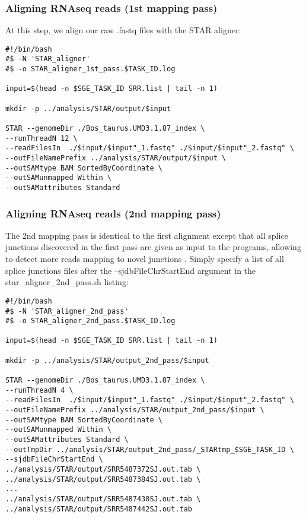 \subsubsection{Aligning RNAseq reads (1st mapping pass)}

At this step, we align our raw .fastq files with the STAR aligner:

\begin{verbatim}
#!/bin/bash
#$ -N 'STAR_aligner'
#$ -o STAR_aligner_1st_pass.$TASK_ID.log

input=$(head -n $SGE_TASK_ID SRR.list | tail -n 1)

mkdir -p ../analysis/STAR/output/$input

STAR --genomeDir ./Bos_taurus.UMD3.1.87_index \
--runThreadN 12 \
--readFilesIn  ./$input/$input"_1.fastq" ./$input/$input"_2.fastq" \
--outFileNamePrefix ../analysis/STAR/output/$input \
--outSAMtype BAM SortedByCoordinate \
--outSAMunmapped Within \
--outSAMattributes Standard
\end{verbatim}



\subsubsection{Aligning RNAseq reads (2nd mapping pass)}

The 2nd mapping pass is identical to the first alignment except that all splice junctions discovered in the first pass are given as input to the programs, allowing to detect more reads mapping to novel junctions  \cite{Dobin2013}. Simply specify a list of all splice junctions files after the --sjdbFileChrStartEnd argument in the star\_aligner\_2nd\_pass.sh listing:

\begin{verbatim}
#!/bin/bash
#$ -N 'STAR_aligner_2nd_pass'
#$ -o STAR_aligner_2nd_pass.$TASK_ID.log

input=$(head -n $SGE_TASK_ID SRR.list | tail -n 1)

mkdir -p ../analysis/STAR/output_2nd_pass/$input

STAR --genomeDir ./Bos_taurus.UMD3.1.87_index \
--runThreadN 4 \
--readFilesIn  ./$input/$input"_1.fastq" ./$input/$input"_2.fastq" \
--outFileNamePrefix ../analysis/STAR/output_2nd_pass/$input \
--outSAMtype BAM SortedByCoordinate \
--outSAMunmapped Within \
--outSAMattributes Standard \
--outTmpDir ../analysis/STAR/output_2nd_pass/_STARtmp_$SGE_TASK_ID \
--sjdbFileChrStartEnd \
../analysis/STAR/output/SRR5487372SJ.out.tab \
../analysis/STAR/output/SRR5487384SJ.out.tab \
...
../analysis/STAR/output/SRR5487430SJ.out.tab \
../analysis/STAR/output/SRR5487442SJ.out.tab
\end{verbatim}



